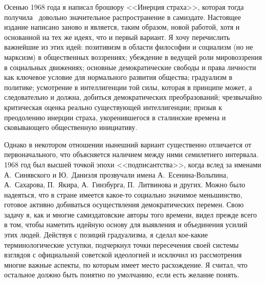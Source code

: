 \documentclass{book}
\begin{document}
Осенью 1968 года я написал брошюру <<Инерция страха>>, которая тогда получила  довольно значительное распространение в 
самиздате. Настоящее издание написано заново и яв­ляется, таким образом, новой работой, хотя и основанной на тех же идеях, что и 
первый вариант. Я хочу перечислить важнейшие из этих идей: позитивизм в области философии и социализм (но не марксизм) в 
общественных воззрениях; убеждение в ведущей роли мировоззрения в социальных движениях; основные демократические свободы и права 
личности как ключевое условие для нормального развития общества; градуализм в политике; усмотрение в интеллигенции той силы, 
которая в принципе может, а следовательно и должна, добиться демократических преобразований; чрезвычайно критическая оценка 
реально существующей интеллигенции; призыв к преодолению инерции страха, укоренившегося в сталинские времена и сковывающего 
общественную инициативу.

Однако в некотором отношении нынешний вариант существенно отличается от первоначального, что объясняется наличием между ними 
семилетнего интервала. 1968 год был высшей точкой эпохи <<подписантства>>, когда вслед за именами А.~Синявского и Ю.~Даниэля 
прозвучали имена А.~Есенина-Вольпина, А.~Сахарова, П.~Якира, А.~Гинзбурга, П.~Литвинова и других. Можно было надеяться, что в 
стране имеется какое-то социально значимое меньшинство, готовое активно добиваться осуществления демократических перемен. Свою 
задачу я, как и многие самиздатовские авторы того времени, видел прежде всего в том, чтобы наметить идейную основу для выявления 
и объединения усилий этих людей. Действуя с позиций градуализма, я сделал кое-какие терминологические уступки, подчеркнул точки 
пересечения своей системы взглядов с официальной советской идеологией и исключил из рассмотрения многие важные аспекты, по 
которым имеет место расхождение. Я считал, что остальное должно быть понятно по умолчанию, если есть желание понять.
\end{document}
